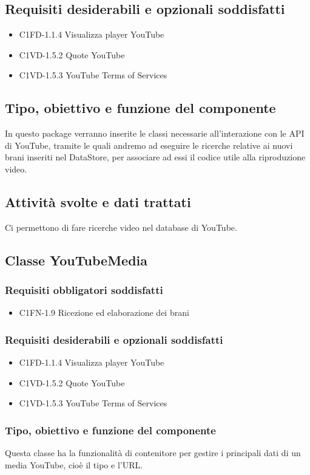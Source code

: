 \subsection*{Requisiti desiderabili e opzionali soddisfatti}
\begin{itemize}
    \item C1FD-1.1.4 Visualizza player YouTube
    \item C1VD-1.5.2 Quote YouTube
    \item C1VD-1.5.3 YouTube Terms of Services
\end{itemize}
\subsection*{Tipo, obiettivo e funzione del componente}
In questo package verranno inserite le classi necessarie all'interazione con le
API di YouTube, tramite le quali andremo ad eseguire le ricerche relative ai
nuovi brani inseriti nel DataStore, per associare ad essi il codice utile alla
riproduzione video.
\subsection*{Attivit\`a svolte e dati trattati}
Ci permettono di fare ricerche video nel database di YouTube.

\subsection{Classe YouTubeMedia}
\subsubsection*{Requisiti obbligatori soddisfatti}
\begin{itemize}
    \item C1FN-1.9 Ricezione ed elaborazione dei brani
\end{itemize}
\subsubsection*{Requisiti desiderabili e opzionali soddisfatti}
\begin{itemize}
    \item C1FD-1.1.4 Visualizza player YouTube
    \item C1VD-1.5.2 Quote YouTube
    \item C1VD-1.5.3 YouTube Terms of Services
\end{itemize}
\subsubsection*{Tipo, obiettivo e funzione del componente}
Questa classe ha la funzionalit\`a di contenitore per gestire i principali
dati di un media YouTube, cio\`e il tipo e l'URL.

